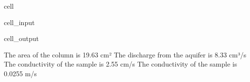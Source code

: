 \documentclass[letterpaper,10pt,english]{jupyterBook}
\begin{document}
\begin{sphinxuseclass}{cell}
\begin{sphinxVerbatimInput}
\begin{sphinxuseclass}{cell_input}
\end{sphinxuseclass}\end{sphinxVerbatimInput}
\begin{sphinxVerbatimOutput}

\begin{sphinxuseclass}{cell_output}
\begin{sphinxVerbatim}[commandchars=\\\{\}]
The area of the column is 19.63 cm²
The discharge from the aquifer is 8.33 cm³/s
The conductivity of the sample is 2.55 cm/s
The conductivity of the sample is 0.0255 m/s
\end{sphinxVerbatim}

\end{sphinxuseclass}\end{sphinxVerbatimOutput}

\end{sphinxuseclass}
\end{document}
